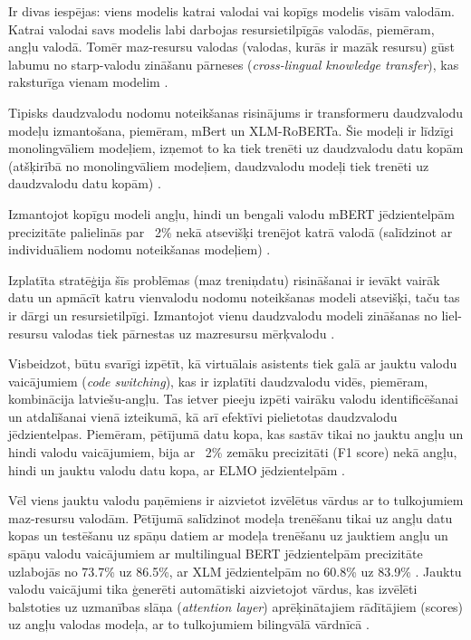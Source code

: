 Ir divas iespējas: viens modelis katrai valodai vai kopīgs modelis visām valodām. Katrai valodai savs modelis labi darbojas resursietilpīgās valodās, piemēram, angļu valodā. Tomēr maz-resursu valodas (valodas, kurās ir mazāk resursu) gūst labumu no starp-valodu zināšanu pārneses (\textit{cross-lingual knowledge transfer}), kas raksturīga vienam modelim \cite{de-bruyn-2022}.

Tipisks daudzvalodu nodomu noteikšanas risinājums ir transformeru daudzvalodu modeļu izmantošana, piemēram, mBert un XLM-RoBERTa. Šie modeļi ir līdzīgi monolingvāliem modeļiem, izņemot to ka tiek trenēti uz daudzvalodu datu kopām (atšķirībā no monolingvāliem modeļiem, daudzvalodu modeļi tiek trenēti uz daudzvalodu datu kopām) \cite{de-bruyn-2022}. 

Izmantojot kopīgu modeli angļu, hindi un bengali valodu mBERT jēdzientelpām precizitāte palielinās par ~2\% nekā atsevišķi trenējot katrā valodā (salīdzinot ar individuāliem nodomu noteikšanas modeļiem) \cite{firdaus2023}.



Izplatīta stratēģija šīs problēmas (maz treniņdatu) risināšanai ir ievākt vairāk datu un apmācīt katru vienvalodu nodomu noteikšanas modeli atsevišķi, taču tas ir dārgi un resursietilpīgi. Izmantojot vienu daudzvalodu modeli zināšanas no liel-resursu valodas tiek pārnestas uz mazresursu mērķvalodu \cite{liu2020}.

Visbeidzot, būtu svarīgi izpētīt, kā virtuālais asistents tiek galā ar jauktu valodu vaicājumiem (\textit{code switching}), kas ir izplatīti daudzvalodu vidēs, piemēram, kombinācija latviešu-angļu. Tas ietver pieeju izpēti vairāku valodu identificēšanai un atdalīšanai vienā izteikumā, kā arī efektīvi pielietotas daudzvalodu jēdzientelpas. Piemēram, pētījumā datu kopa, kas sastāv tikai no jauktu angļu un hindi valodu vaicājumiem, bija ar ~2\% zemāku precizitāti (F1 score) nekā angļu, hindi un jauktu valodu datu kopa, ar ELMO jēdzientelpām \cite{jayarao2018}.

Vēl viens jauktu valodu paņēmiens ir aizvietot izvēlētus vārdus ar to tulkojumiem maz-resursu valodām. Pētījumā salīdzinot modeļa trenēšanu tikai uz angļu datu kopas un testēšanu uz spāņu datiem ar modeļa trenēšanu uz jauktiem angļu un spāņu valodu vaicājumiem ar multilingual BERT jēdzientelpām precizitāte uzlabojās no 73.7\% uz 86.5\%, ar XLM jēdzientelpām no 60.8\% uz 83.9\% \cite{liu2020}. Jauktu valodu vaicājumi tika ģenerēti automātiski aizvietojot vārdus, kas izvēlēti balstoties uz uzmanības slāņa (\textit{attention layer}) aprēķinātajiem rādītājiem (scores) uz angļu valodas modeļa, ar to tulkojumiem bilingvālā vārdnīcā \cite{liu2020}. 


